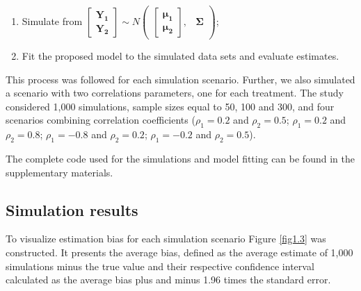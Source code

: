 \documentclass[useAMS,referee]{biom}
\begin{document}
\begin{enumerate}
\item Simulate from $	\begin{bmatrix}\mathbf{Y_1}\\
\mathbf{Y_2}
\end{bmatrix} \sim  N
\begin{pmatrix}
\begin{bmatrix}
\boldsymbol{\mu_1}\\
\boldsymbol{\mu_2}
\end{bmatrix}\!\!,&
\boldsymbol{\Sigma}
\end{pmatrix}
$;\\

\item Fit the proposed model to the simulated data sets and evaluate estimates.

\end{enumerate}

This process was followed for each simulation scenario.
Further, we also simulated a scenario with two correlations parameters, one for each treatment. The study considered 1,000 simulations, sample sizes equal to 50, 100 and 300, and four scenarios combining correlation coefficients ($\rho_1=0.2$ and $\rho_2=0.5$; $\rho_1=0.2$ and $\rho_2=0.8$; $\rho_1=-0.8$ and $\rho_2=0.2$; $\rho_1=-0.2$ and $\rho_2=0.5$).

The complete code used for the simulations and model fitting can be found in the supplementary materials.





\subsection{Simulation results}


To visualize estimation bias for each simulation scenario Figure \ref{fig1.3}
was constructed. It presents the average bias, defined as the average estimate of 1,000 simulations minus the true value and their respective confidence interval calculated as the average bias plus and minus 1.96 times the standard error.
\end{document}
